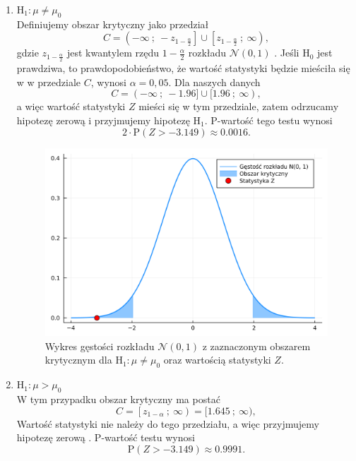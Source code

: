 \documentclass[12pt]{mwart}
\begin{document}
	\begin{enumerate}[label=(\textbf{\alph*})]
		
		\item {\boldmath $\mathrm{H_1}: \mu \neq \mu_0$}\\
		Definiujemy obszar krytyczny jako przedział
		$$ C = \left( -\infty \ ; \ -z_{1-\frac{\alpha}{2}} \right] \cup \left[ z_{1-\frac{\alpha}{2}} \ ; \ \infty \right), $$
		gdzie  $z_{1-\frac{\alpha}{2}}$  jest kwantylem rzędu $1 - \frac{\alpha}{2}$ rozkładu  $\mathcal{N}(0,1)$ . Jeśli $\mathrm{H_0}$ jest prawdziwa, to prawdopodobieństwo, że wartość statystyki będzie mieściła się w w przedziale $C$, wynosi \mbox{$\alpha = 0,05$}. Dla naszych danych
		$$ C = (-\infty \ ; \ -1.96] \cup [1.96 \ ; \ \infty), $$
		a więc wartość statystyki $Z$ mieści się w tym przedziale, zatem odrzucamy hipotezę zerową i przyjmujemy hipotezę $\mathrm{H_1}$.
		P-wartość tego testu wynosi
		$$ 2\cdot\mathrm{P}\left(Z > -3.149 \right) \approx 0.0016. $$
		
		\begin{figure}[H]
			\centering
			\includegraphics[scale=0.11]{images/srednia_a.png}
			\caption{Wykres gęstości rozkładu $\mathcal{N}(0, 1)$ z zaznaczonym obszarem krytycznym dla $\mathrm{H_1}: \mu \neq \mu_0$ oraz wartością statystyki $Z$.}
		\end{figure}
		
		\item {\boldmath $\mathrm{H_1}: \mu > \mu_0$}\\
		W tym przypadku obszar krytyczny ma postać
		$$ C = \left[ z_{1-\alpha} \ ; \ \infty \right) = [1.645 \ ; \ \infty), $$
		Wartość statystyki nie należy do tego przedziału, a więc przyjmujemy hipotezę zerową .
		P-wartość testu wynosi
		$$ \mathrm{P}\left(Z > -3.149 \right) \approx 0.9991. $$
		

\end{enumerate}
\end{document}
